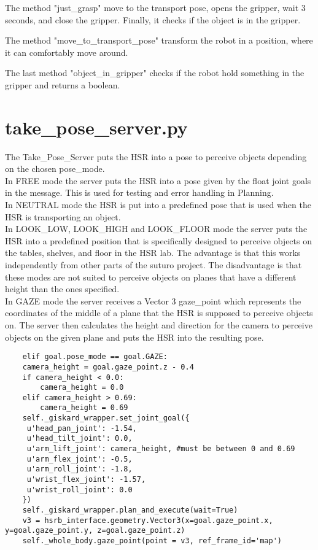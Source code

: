 \documentclass[main.tex]{subfiles}
\begin{document}
			\vspace{0,25 cm}
			The method "just\_grasp" move to the transport pose, opens the gripper, wait 3 seconds, and close the gripper. Finally, it checks if the object is in the gripper.
			
			\vspace{0,25 cm}
			The method "move\_to\_transport\_pose" transform the robot in a position, where it can comfortably move around.
			
			\vspace{0,25 cm}
			The last method "object\_in\_gripper" checks if the robot hold something in the gripper and returns a boolean.\\
			
			\newpage
			\section{take\_pose\_server.py} 
			
			The Take\_Pose\_Server puts the HSR into a pose to perceive objects depending on the chosen pose\_mode. \\
			In FREE mode the server puts the HSR into a pose given by the float joint goals in the message. This is used for testing and error handling in Planning. \\
			In NEUTRAL mode the HSR is put into a predefined pose that is used when the HSR is transporting an object. \\
			In LOOK\_LOW, LOOK\_HIGH and LOOK\_FLOOR mode the server puts the HSR into a predefined position that is specifically designed to perceive objects on the tables, shelves, and floor in the HSR lab. The advantage is that this works independently from other parts of the suturo project. The disadvantage is that these modes are not suited to perceive objects on planes that have a different height than the ones specified. \\
			In GAZE mode the server receives a Vector 3 gaze\_point which represents the coordinates of the middle of a plane that the HSR is supposed to perceive objects on. The server then calculates the height and direction for the camera to perceive objects on the given plane and puts the HSR into the resulting pose.
			
				\begin{lstlisting}
	elif goal.pose_mode == goal.GAZE:
    camera_height = goal.gaze_point.z - 0.4 
    if camera_height < 0.0:
        camera_height = 0.0
    elif camera_height > 0.69:
        camera_height = 0.69
    self._giskard_wrapper.set_joint_goal({
     u'head_pan_joint': -1.54,
     u'head_tilt_joint': 0.0,
     u'arm_lift_joint': camera_height, #must be between 0 and 0.69
     u'arm_flex_joint': -0.5,
     u'arm_roll_joint': -1.8,
     u'wrist_flex_joint': -1.57,
     u'wrist_roll_joint': 0.0
    })
    self._giskard_wrapper.plan_and_execute(wait=True)
    v3 = hsrb_interface.geometry.Vector3(x=goal.gaze_point.x, y=goal.gaze_point.y, z=goal.gaze_point.z)
    self._whole_body.gaze_point(point = v3, ref_frame_id='map')
	\end{lstlisting}
			
\end{document}
